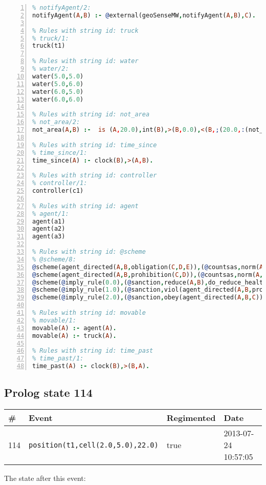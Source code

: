 \documentclass[11pt]{article}\usepackage[utf8]{inputenc}\usepackage{geometry}
\begin{document}
\begin{lstlisting}[language=Prolog, numbers=left]
% Rules with string id: notifyAgent
% notifyAgent/2:
notifyAgent(A,B) :- @external(geoSenseMW,notifyAgent(A,B),C).

% Rules with string id: truck
% truck/1:
truck(t1)

% Rules with string id: water
% water/2:
water(5.0,5.0)
water(5.0,6.0)
water(6.0,5.0)
water(6.0,6.0)

% Rules with string id: not_area
% not_area/2:
not_area(A,B) :-  is (A,20.0),int(B),>(B,0.0),<(B,;(20.0,:(not_area(A,B), is (-(B),20.0)))),int(A),>(A,0.0),<(A,;(20.0,:(area(A,B),-(int(A))))),int(B),>(A,0.0),>(B,0.0),<(A,21.0),<(B,21.0).

% Rules with string id: time_since
% time_since/1:
time_since(A) :- clock(B),>(A,B).

% Rules with string id: controller
% controller/1:
controller(c1)

% Rules with string id: agent
% agent/1:
agent(a1)
agent(a2)
agent(a3)

% Rules with string id: @scheme
% @scheme/8:
@scheme(agent_directed(A,B,obligation(C,D,E)),(@countsas,norm(A,B,F,obligation(C,D,E)),F),false,(listTrue(C)),(time_past(D)),false,[plus(viol(agent_directed(A,B,obligation(C,D,E))))|[]],[plus(obey(agent_directed(A,B,obligation(C,D,E))))|[]])
@scheme(agent_directed(A,B,prohibition(C,D)),(@countsas,norm(A,B,E,prohibition(C,D)),E),(listTrue(C)),false,(false),false,[plus(viol(agent_directed(A,B,prohibition(C,D))))|[]],[plus(obey(agent_directed(A,B,prohibition(C,D))))|[]])
@scheme(@imply_rule(0.0),(@sanction,reduce(A,B),do_reduce_health(A,B),notifyAgent(A,changed(status))),true,false,false,false,[min(reduce(A,B))|[]],[])
@scheme(@imply_rule(1.0),(@sanction,viol(agent_directed(A,B,prohibition(C,D))),do_sanction(D)),true,false,false,false,[min(viol(agent_directed(A,B,prohibition(C,D))))|[]],[])
@scheme(@imply_rule(2.0),(@sanction,obey(agent_directed(A,B,C))),true,false,false,false,[min(obey(agent_directed(A,B,C)))|[]],[])

% Rules with string id: movable
% movable/1:
movable(A) :- agent(A).
movable(A) :- truck(A).

% Rules with string id: time_past
% time_past/1:
time_past(A) :- clock(B),>(B,A).

\end{lstlisting}
\clearpage 
\subsection{Prolog state 114}
\begin{table}[ht]
\centering 
\begin{tabular}{l l l l} 
\textbf{\#} & \textbf{Event} & \textbf{Regimented} & \textbf{Date} \\ [0.5ex] 
\hline
114&\texttt{position(t1,cell(2.0,5.0),22.0)}&true&2013-07-24 10:57:05\\ [1ex] \hline\end{tabular}
\end{table}
The state after this event:
\end{document}
